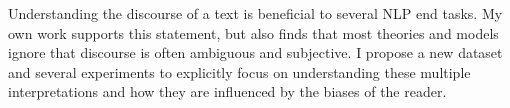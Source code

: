 Understanding the discourse of a text is beneficial to several NLP end tasks. My own work supports this statement, but also finds that most theories and models ignore that discourse is often ambiguous and subjective. I propose a new dataset and several experiments to explicitly focus on understanding these multiple interpretations and how they are influenced by the biases of the reader. 

